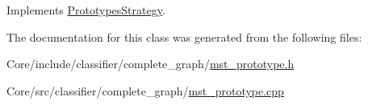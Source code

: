 Implements \hyperlink{classPrototypesStrategy_a0422be14bb6be39a2d06112daf7043c1}{Prototypes\+Strategy}.



The documentation for this class was generated from the following files\+:\begin{DoxyCompactItemize}
\item 
Core/include/classifier/complete\+\_\+graph/\hyperlink{mst__prototype_8h}{mst\+\_\+prototype.\+h}\item 
Core/src/classifier/complete\+\_\+graph/\hyperlink{mst__prototype_8cpp}{mst\+\_\+prototype.\+cpp}\end{DoxyCompactItemize}
